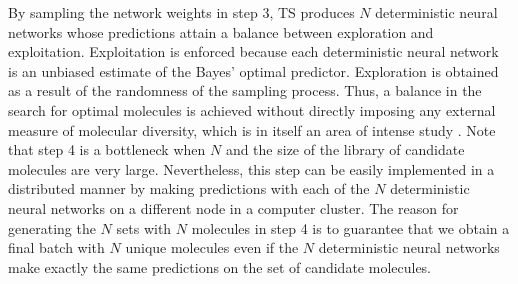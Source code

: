 By sampling the network weights in step 3, TS produces $N$ deterministic neural networks whose predictions attain a balance between exploration and exploitation. Exploitation is enforced because each deterministic neural network is an unbiased estimate of the Bayes' optimal predictor. Exploration is obtained as a result of the randomness of the sampling process. 
Thus, a balance in the search for optimal molecules is achieved without directly imposing any external measure of molecular diversity, which is in itself an area of intense study \cite{Maldonado_2006}. 
Note that step 4 is a bottleneck when $N$ and the size of the library of candidate molecules are very large.
Nevertheless, this step can be easily implemented in a distributed manner by making predictions with each of
the $N$ deterministic neural networks on a different node in a computer cluster. The reason for generating the $N$ sets with $N$ molecules in step 4 is to guarantee that we obtain a final batch with $N$ unique molecules even if the $N$ deterministic neural networks make exactly the same predictions on the set of candidate molecules.